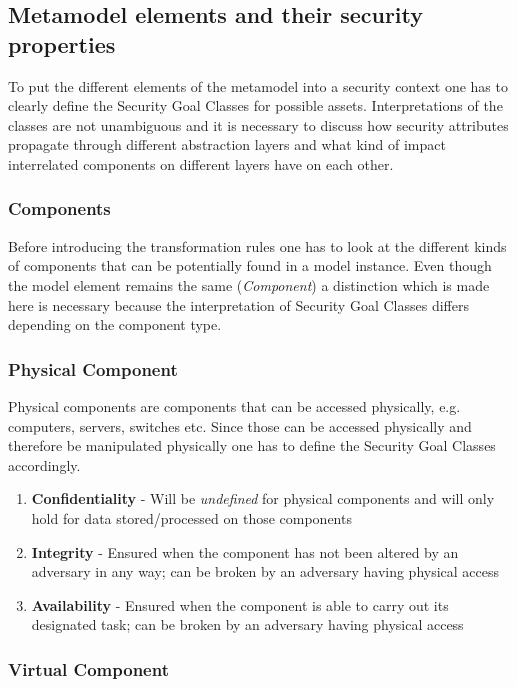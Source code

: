 \subsection{Metamodel elements and their security properties}
To put the different elements of the metamodel into a security context one has to clearly define the Security Goal Classes for possible assets. Interpretations of the classes are not unambiguous and it is necessary to discuss how security attributes propagate through different abstraction layers and what kind of impact interrelated components on different layers have on each other. 

\subsubsection{Components}

Before introducing the transformation rules one has to look at the different kinds of components that can be potentially found in a model instance. Even though the model element remains the same (\textit{Component}) a distinction which is made here is necessary because the interpretation of Security Goal Classes differs depending on the component type. 

\subsubsection*{Physical Component}

Physical components are components that can be accessed physically, e.g. computers, servers, switches etc. Since those can be accessed physically and therefore be manipulated physically one has to define the Security Goal Classes accordingly.

\begin{enumerate}
\item \textbf{Confidentiality} - Will be \textit{undefined} for physical components and will only hold for data stored/processed on those components
\item \textbf{Integrity} - Ensured when the component has not been altered by an adversary in any way; can be broken by an adversary having physical access
\item \textbf{Availability} - Ensured when the component is able to carry out its designated task; can be broken by an adversary having physical access
\end{enumerate}

\subsubsection*{Virtual Component}


